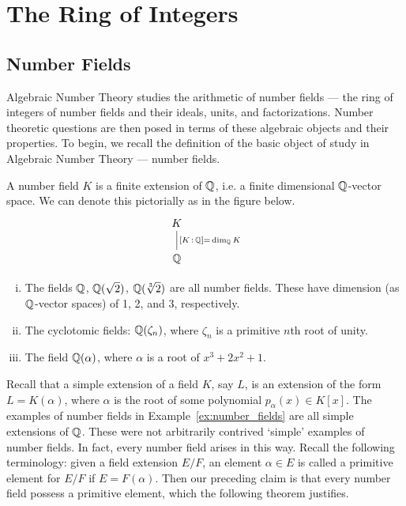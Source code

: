 \newpage
\section{The Ring of Integers}
\subsection{Number Fields}

Algebraic Number Theory studies the arithmetic of number fields --- the ring of integers of number fields and their ideals, units, and factorizations. Number theoretic questions are then posed in terms of these algebraic objects and their properties. To begin, we recall the definition of the basic object of study in Algebraic Number Theory --- number fields. 


\begin{dfn}
A number field $K$ is a finite extension of $\mathbb{Q}$, i.e. a finite dimensional $\mathbb{Q}$-vector space. We can denote this pictorially as in the figure below. 
	\[
	\begin{tikzcd}
	K \arrow[dash]{d}{[K\,:\,\Q]=\,\dim_\Q K} \\
	\Q
	\end{tikzcd}
	\]
\end{dfn}


\begin{ex} \label{ex:number_fields} \hfill
	\begin{enumerate}[(i)]
	\item The fields $\mathbb{Q}$, $\mathbb{Q}(\sqrt{2})$, $\mathbb{Q}(\sqrt[3]{2})$ are all number fields. These have dimension (as $\mathbb{Q}$-vector spaces) of 1, 2, and 3, respectively. 
	\item The cyclotomic fields: $\mathbb{Q}(\zeta_n)$, where $\zeta_n$ is a primitive $n$th root of unity.
	\item The field $\mathbb{Q}(\alpha)$, where $\alpha$ is a root of $x^3+2x^2+1$. \xqed \pskip
	\end{enumerate}
\end{ex}


Recall that a simple extension of a field $K$, say $L$, is an extension of the form $L= K(\alpha)$, where $\alpha$ is the root of some polynomial $p_\alpha(x) \in K[x]$. The examples of number fields in Example~\ref{ex:number_fields} are all simple extensions of $\mathbb{Q}$. These were not arbitrarily contrived `simple' examples of number fields. In fact, every number field arises in this way. Recall the following terminology: given a field extension $E/F$, an element $\alpha \in E$ is called a primitive element for $E/F$ if $E=F(\alpha)$. Then our preceding claim is that every number field possess a primitive element, which the following theorem justifies. 



